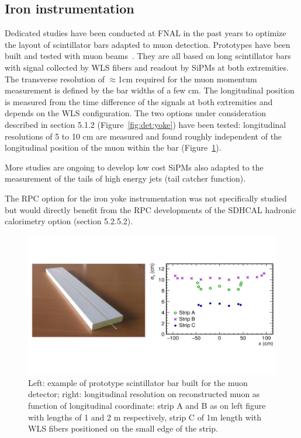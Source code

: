 


\subsection{Iron instrumentation}

Dedicated studies have been conducted at FNAL in the past years to optimize the layout of scintillator bars adapted to muon detection. Prototypes have been built and tested with muon beams~\cite{Denisov:2015jjl}. They are all based on long scintillator bars with signal collected by WLS fibers and readout by SiPMs at both extremities. The transverse resolution of $\approx$1cm required for the muon momentum measurement is defined by the bar widths of a few cm. The longitudinal position is measured from the time difference of the signals at both extremities and depends on the WLS configuration. The two options under consideration described in section 5.1.2 (Figure~\ref{fig:det:yoke}) have been tested: longitudinal resolutions of 5 to 10 cm are measured and found roughly independent of the longitudinal position of the muon within the bar (Figure~\ref{fig:det:Iron_proto}). 

More studies are ongoing to develop low cost SiPMs also adapted to the measurement of the tails of high energy jets (tail catcher function). 

The RPC option for the iron yoke instrumentation was not specifically studied but would directly benefit from the RPC developments of the SDHCAL hadronic calorimetry option (section 5.2.5.2).   


\begin{figure}[t!]
\centering
\includegraphics[width=1.0\hsize]{Detector/fig/Iron_proto.jpg}
\caption{Left: example of prototype scintillator bar built for the muon detector; right: longitudinal resolution on reconstructed muon as function of longitudinal coordinate: strip A and B as on left figure with lengths of 1 and 2 m respectively, strip C of 1m length with WLS fibers positioned on the small edge of the strip.}
\label{fig:det:Iron_proto}
\end{figure}

\vspace{2cm}